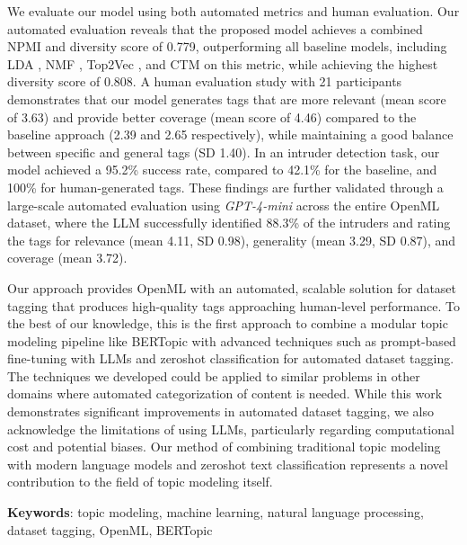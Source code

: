 We evaluate our model using both automated metrics and human evaluation. Our automated evaluation reveals that the proposed model achieves a combined NPMI and diversity score of 0.779, outperforming all baseline models, including LDA \cite{blei_latent_2001}, NMF \cite{shahnaz_document_2006, kasiviswanathan_emerging_2011, yan_learning_2013}, Top2Vec \cite{angelov_top2vec_2020}, and CTM \cite{bianchi_pre-training_2021, bianchi_cross-lingual_2021} on this metric, while achieving the highest diversity score of 0.808. A human evaluation study with 21 participants demonstrates that our model generates tags that are more relevant (mean score of 3.63) and provide better coverage (mean score of 4.46) compared to the baseline approach (2.39 and 2.65 respectively), while maintaining a good balance between specific and general tags (SD 1.40). In an intruder detection task, our model achieved a 95.2\% success rate, compared to 42.1\% for the baseline, and 100\% for human-generated tags. These findings are further validated through a large-scale automated evaluation using \textit{GPT-4-mini} across the entire OpenML dataset, where the LLM successfully identified 88.3\% of the intruders and rating the tags for relevance (mean 4.11, SD 0.98), generality (mean 3.29, SD 0.87), and coverage (mean 3.72).

Our approach provides OpenML with an automated, scalable solution for dataset tagging that produces high-quality tags approaching human-level performance. To the best of our knowledge, this is the first approach to combine a modular topic modeling pipeline like BERTopic with advanced techniques such as prompt-based fine-tuning with LLMs and zeroshot classification for automated dataset tagging. The techniques we developed could be applied to similar problems in other domains where automated categorization of content is needed. While this work demonstrates significant improvements in automated dataset tagging, we also acknowledge the limitations of using LLMs, particularly regarding computational cost and potential biases. Our method of combining traditional topic modeling with modern language models and zeroshot text classification represents a novel contribution to the field of topic modeling itself.

\textbf{Keywords}: topic modeling, machine learning, natural language processing, dataset tagging, OpenML, BERTopic